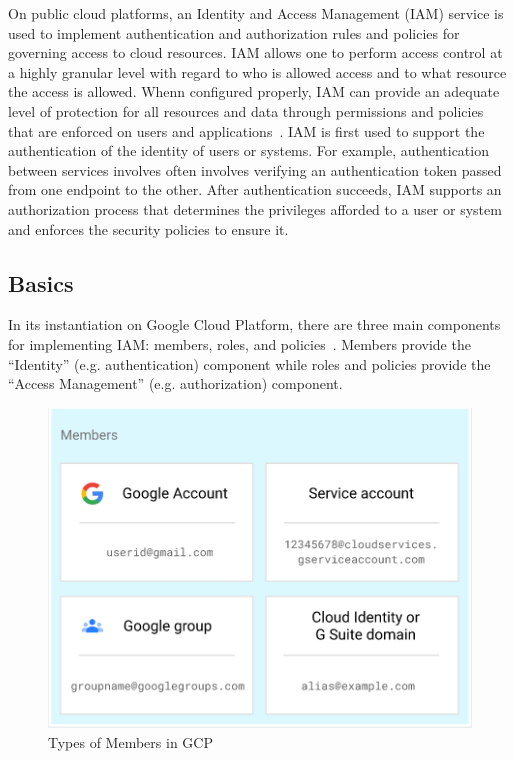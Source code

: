 On public cloud platforms, an Identity and Access Management (IAM) service is used to implement
authentication and authorization rules and policies for governing access to cloud resources.
IAM allows one to perform access control at a highly granular level with regard to who is allowed access and to what resource the access is allowed.
Whenn configured properly, IAM can provide an adequate level of protection for all resources and data through permissions and policies that are enforced on users and applications~\cite{AlmullaSameeraAbdulrahmanandYeun2010}.
IAM is first used to support the authentication of the identity of users or systems. For example, authentication between services involves often involves verifying an authentication token
passed from one endpoint to the other.  After authentication succeeds, IAM supports an
authorization process that determines the privileges afforded to a user or system and enforces
the security policies to ensure it.

\subsection{Basics}
In its instantiation on
Google Cloud Platform, there are three main components for implementing IAM: members, roles, and policies~\cite{Googlecloudiam}.  Members
provide the ``Identity'' (e.g. authentication) component while roles and policies provide the ``Access Management'' (e.g.
authorization) component.

\begin{figure}[h]
  \centering
  \includegraphics[width=\linewidth]{pic/mem}
  \caption {Types of Members in GCP}
  \label{fig:mem}
\end{figure}

